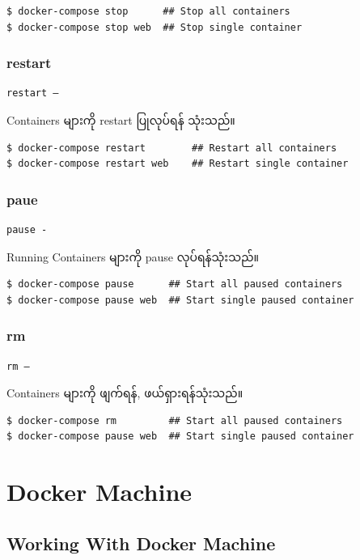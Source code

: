 \documentclass{article}
\begin{document}
\begin{verbatim}
$ docker-compose stop      ## Stop all containers 
$ docker-compose stop web  ## Stop single container
\end{verbatim}

\subsubsection{restart}\label{restatr}
\begin{verbatim}
restart –
\end{verbatim}
Containers များကို restart ပြုလုပ်ရန် သုံးသည်။

\begin{verbatim}
$ docker-compose restart        ## Restart all containers 
$ docker-compose restart web    ## Restart single container
\end{verbatim}

\subsubsection{paue}\label{pause}
\begin{verbatim}
pause -
\end{verbatim}
Running Containers များကို pause လုပ်ရန်သုံးသည်။

\begin{verbatim}
$ docker-compose pause      ## Start all paused containers 
$ docker-compose pause web  ## Start single paused container
\end{verbatim}

\subsubsection{rm}\label{rm}
\begin{verbatim}
rm –
\end{verbatim}
Containers များကို ဖျက်ရန်, ဖယ်ရှားရန်သုံးသည်။

\begin{verbatim}
$ docker-compose rm         ## Start all paused containers 
$ docker-compose pause web  ## Start single paused container
\end{verbatim}

\pagebreak

\section{Docker Machine}\label{docker-machine}

\subsection{Working With Docker
Machine}\label{working-with-docker-machine}
\end{document}
